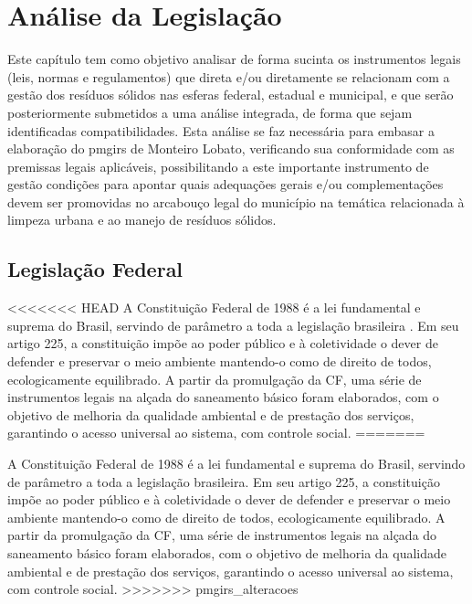 	\section{Análise da Legislação}
	Este capítulo tem como objetivo analisar de forma sucinta os instrumentos legais (leis, normas e regulamentos) que direta e/ou diretamente se relacionam com a gestão dos resíduos sólidos nas esferas federal, estadual e municipal, e que serão posteriormente submetidos a uma análise integrada, de forma que sejam identificadas compatibilidades. Esta análise se faz necessária para embasar a elaboração do \acrfull{pmgirs} %
	de Monteiro Lobato, verificando sua conformidade com as premissas legais aplicáveis, possibilitando a este importante instrumento de gestão condições para apontar quais adequações gerais e/ou complementações devem ser promovidas no arcabouço legal do município na temática relacionada à limpeza urbana e ao manejo de resíduos sólidos.
	
	\subsection{Legislação Federal}
<<<<<<< HEAD
	A Constituição Federal de 1988 é a lei fundamental e suprema do Brasil, servindo de parâmetro a toda a legislação brasileira \cite{do1988constituiccao}. Em seu artigo 225, a constituição impõe ao poder público e à coletividade o dever de defender e preservar o meio ambiente mantendo-o como de direito de todos, ecologicamente equilibrado. A partir da promulgação da CF, uma série de instrumentos legais na alçada do saneamento básico foram elaborados, com o objetivo de melhoria da qualidade ambiental e de prestação dos serviços, garantindo o acesso universal ao sistema, com controle social.
=======
	
	A Constituição Federal de 1988 é a lei fundamental e suprema do Brasil, servindo de parâmetro a toda a legislação brasileira. Em seu artigo 225, a constituição impõe ao poder público e à coletividade o dever de defender e preservar o meio ambiente mantendo-o como de direito de todos, ecologicamente equilibrado. A partir da promulgação da CF, uma série de instrumentos legais na alçada do saneamento básico foram elaborados, com o objetivo de melhoria da qualidade ambiental e de prestação dos serviços, garantindo o acesso universal ao sistema, com controle social.
>>>>>>> pmgirs_alteracoes
	
